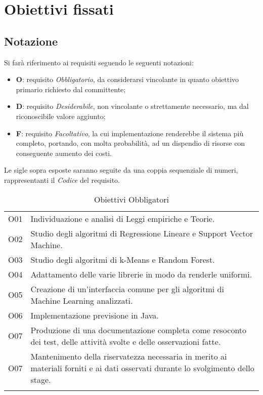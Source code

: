 \section{Obiettivi fissati}
\subsection{Notazione}
Si farà riferimento ai requisiti seguendo le seguenti notazioni:
\begin{itemize}
\item \textbf{O}: requisito \textit{Obbligatorio}, da considerarsi vincolante in quanto obiettivo primario richiesto dal committente;
\item \textbf{D}: requisito \textit{Desiderabile}, non vincolante o strettamente necessario, ma dal riconoscibile valore aggiunto;
\item \textbf{F}: requisito \textit{Facoltativo}, la cui implementazione renderebbe il sistema più completo, portando,
con molta probabilità, ad un dispendio di risorse con conseguente aumento dei
costi.
\end{itemize}
Le sigle sopra esposte saranno seguite da una coppia sequenziale di numeri, rappresentanti il \textit{Codice} del requisito.

{\renewcommand{\arraystretch}{2}
\begin{longtable}{|p{1cm}| p{12.25cm} |}
	\hline
	\rowcolor{blue} \multicolumn{2}{|c|}{
	\textbf{\textcolor{white}{Obbligatori}}
	} \\
		\endhead
		\hline \rowcolor{lightbrown}
		O01 & 
		Individuazione e analisi di Leggi empiriche  e Teorie. \\	
		\hline \rowcolor{lighterbrown}
		O02 & 
		Studio degli algoritmi di Regressione Lineare e Support Vector Machine. \\	
		\hline \rowcolor{lightbrown}
		O03 & 
		Studio degli algoritmi di k-Means e Random Forest.\\	
	\hline \rowcolor{lighterbrown}
		O04 & 
		Adattamento delle varie librerie in modo da renderle uniformi.\\	
	\hline \rowcolor{lightbrown}
		O05 & 
		Creazione di un'interfaccia comune per gli algoritmi di Machine Learning analizzati.\\	
	\hline \rowcolor{lighterbrown}
		O06 & 
		Implementazione previsione in Java.\\	
	\hline \rowcolor{lightbrown}
		O07 & 
		Produzione di una documentazione completa come resoconto dei test, delle attività svolte e delle osservazioni fatte.\\	
	\hline \rowcolor{lighterbrown}
		O07 & 
		Mantenimento della riservatezza necessaria in merito ai materiali forniti e ai dati osservati durante lo svolgimento dello stage.\\	
	\hline
	\caption{Obiettivi Obbligatori}\label{tab:obb-ob}
\end{longtable}}

